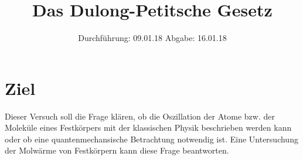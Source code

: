

\subject{V201}
\title{Das Dulong-Petitsche Gesetz}
\date{%
  Durchführung: 09.01.18
  \hspace{3em}
  Abgabe: 16.01.18
}



\maketitle
\thispagestyle{empty}
\tableofcontents
\newpage

\section{Ziel}
\label{sec:Ziel}

Dieser Versuch soll die Frage klären,
ob die Oszillation der Atome bzw. der Moleküle eines Festkörpers mit der klassischen Physik beschrieben werden kann oder
ob eine quantenmechansische Betrachtung notwendig ist.
Eine Untersuchung der Molwärme von Festkörpern kann diese Frage beantworten.






\printbibliography{}


